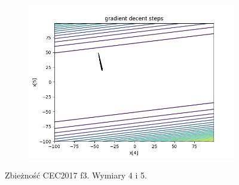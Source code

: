 \begin{figure}[h!]
\begin{subfigure}[b]{0.45\linewidth}
			\includegraphics[width=\linewidth]{photos/f3_3_2.png}
		\end{subfigure}
		\caption{Zbieżność CEC2017 f3. Wymiary 4 i 5.}
	\end{figure}

